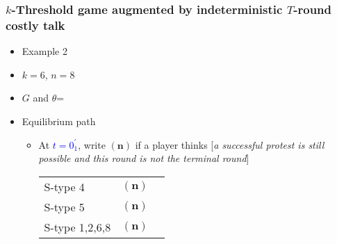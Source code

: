 \documentclass[9pt,handout]{beamer}
\begin{document}
\begin{frame}
  \frametitle{$k$-Threshold game augmented by indeterministic $T$-round costly talk}

\begin{itemize}
\item Example 2
\item $k=6$, $n=8$
\item $G$ and $\theta$=
\begin{center}
\end{center}
\end{itemize}

\begin{itemize}
\item Equilibrium path
\begin{itemize}
\item 
{
At \textcolor{blue}{$t=0^{'}_1$}, write $({\textbf{n}})$ if a player thinks \alert{[}\textit{a successful protest is still possible and this round is not the terminal round}\alert{]}
\begin{table}[h]
\begin{tabular}{ll l}
S-type 4 & $({\textbf{n}})$\\
S-type 5 & $({\textbf{n}})$\\
S-type 1,2,6,8 & $({\textbf{n}})$
\end{tabular}
\end{table}
}

\end{itemize}

\end{itemize}

\end{frame}
\end{document}

